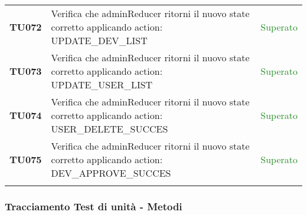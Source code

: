 \begin{tabularx}{\textwidth}{cXc}
	\textbf{TU072} & Verifica che adminReducer ritorni il nuovo state corretto applicando action: UPDATE\_DEV\_LIST & \textcolor{ForestGreen}{Superato} \\
	\textbf{TU073} & Verifica che adminReducer ritorni il nuovo state corretto applicando action: UPDATE\_USER\_LIST & \textcolor{ForestGreen}{Superato} \\
	\textbf{TU074} & Verifica che adminReducer ritorni il nuovo state corretto applicando action: USER\_DELETE\_SUCCES & \textcolor{ForestGreen}{Superato} \\
	\textbf{TU075} & Verifica che adminReducer ritorni il nuovo state corretto applicando action: DEV\_APPROVE\_SUCCES & \textcolor{ForestGreen}{Superato} \\
	
	
	\rowcolor{white}
	\caption{Test di unità}
	\label{tab:tabellatestunità}
\end{tabularx}


\subsubsection{Tracciamento Test di unità - Metodi}


